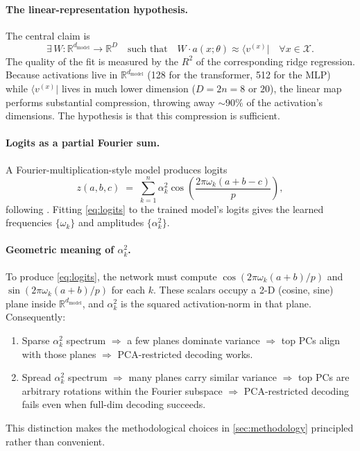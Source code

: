 \documentclass[11pt,a4paper]{article}
\begin{document}
\paragraph{The linear-representation hypothesis.} The central claim is
\begin{equation}\label{eq:lrh}
    \exists\,W : \mathbb{R}^{d_{\mathrm{model}}} \to \mathbb{R}^D \quad \text{such that} \quad W \cdot a(x; \theta) \approx \langle v^{(x)} | \quad \forall x \in \mathcal{X}.
\end{equation}
The quality of the fit is measured by the $R^2$ of the corresponding ridge regression. Because activations live in $\mathbb{R}^{d_{\mathrm{model}}}$ (128 for the transformer, 512 for the MLP) while $\langle v^{(x)} |$ lives in much lower dimension ($D = 2n = 8$ or $20$), the linear map performs substantial compression, throwing away $\sim 90\%$ of the activation's dimensions. The hypothesis is that this compression is sufficient.

\paragraph{Logits as a partial Fourier sum.} A Fourier-multiplication-style model produces logits
\begin{equation}\label{eq:logits}
    z(a, b, c) \;=\; \sum_{k=1}^{n} \alpha_k^2 \cos\!\left(\frac{2\pi\omega_k(a+b-c)}{p}\right),
\end{equation}
following \citet{nanda2023progress, poncini2025compmech}. Fitting \eqref{eq:logits} to the trained model's logits gives the learned frequencies $\{\omega_k\}$ and amplitudes $\{\alpha_k^2\}$.

\paragraph{Geometric meaning of $\alpha_k^2$.} To produce \eqref{eq:logits}, the network must compute $\cos(2\pi\omega_k(a+b)/p)$ and $\sin(2\pi\omega_k(a+b)/p)$ for each $k$. These scalars occupy a 2-D (cosine, sine) plane inside $\mathbb{R}^{d_{\mathrm{model}}}$, and $\alpha_k^2$ is the squared activation-norm in that plane. Consequently:
\begin{enumerate}
    \item Sparse $\alpha_k^2$ spectrum $\Rightarrow$ a few planes dominate variance $\Rightarrow$ top PCs align with those planes $\Rightarrow$ PCA-restricted decoding works.
    \item Spread $\alpha_k^2$ spectrum $\Rightarrow$ many planes carry similar variance $\Rightarrow$ top PCs are arbitrary rotations within the Fourier subspace $\Rightarrow$ PCA-restricted decoding fails even when full-dim decoding succeeds.
\end{enumerate}
This distinction makes the methodological choices in \cref{sec:methodology} principled rather than convenient.
\end{document}
